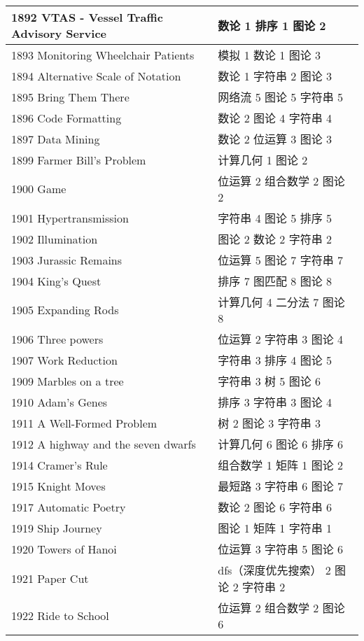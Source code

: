 \begin{longtable}{| p{} | p{} |}
 1892 VTAS - Vessel Traffic Advisory Service  & 数论 1 排序 1 图论 2 \\ \hline
 1893 Monitoring Wheelchair Patients  & 模拟 1 数论 1 图论 3 \\ \hline
 1894 Alternative Scale of Notation  & 数论 1 字符串 2 图论 3 \\ \hline
 1895 Bring Them There  & 网络流 5 图论 5 字符串 5 \\ \hline
 1896 Code Formatting  & 数论 2 图论 4 字符串 4 \\ \hline
 1897 Data Mining  & 数论 2 位运算 3 图论 3 \\ \hline
 1899 Farmer Bill's Problem  & 计算几何 1 图论 2 \\ \hline
 1900 Game  & 位运算 2 组合数学 2 图论 2 \\ \hline
 1901 Hypertransmission  & 字符串 4 图论 5 排序 5 \\ \hline
 1902 Illumination  & 图论 2 数论 2 字符串 2 \\ \hline
 1903 Jurassic Remains  & 位运算 5 图论 7 字符串 7 \\ \hline
 1904 King's Quest  & 排序 7 图匹配 8 图论 8 \\ \hline
 1905 Expanding Rods  & 计算几何 4 二分法 7 图论 8 \\ \hline
 1906 Three powers  & 位运算 2 字符串 3 图论 4 \\ \hline
 1907 Work Reduction  & 字符串 3 排序 4 图论 5 \\ \hline
 1909 Marbles on a tree  & 字符串 3 树 5 图论 6 \\ \hline
 1910 Adam's Genes  & 排序 3 字符串 3 图论 4 \\ \hline
 1911 A Well-Formed Problem  & 树 2 图论 3 字符串 3 \\ \hline
 1912 A highway and the seven dwarfs  & 计算几何 6 图论 6 排序 6 \\ \hline
 1914 Cramer's Rule  & 组合数学 1 矩阵 1 图论 2 \\ \hline
 1915 Knight Moves  & 最短路 3 字符串 6 图论 7 \\ \hline
 1917 Automatic Poetry  & 数论 2 图论 6 字符串 6 \\ \hline
 1919 Ship Journey  & 图论 1 矩阵 1 字符串 1 \\ \hline
 1920 Towers of Hanoi  & 位运算 3 字符串 5 图论 6 \\ \hline
 1921 Paper Cut  & dfs（深度优先搜索） 2 图论 2 字符串 2 \\ \hline
 1922 Ride to School  & 位运算 2 组合数学 2 图论 6 \\ \hline

\end{longtable}
